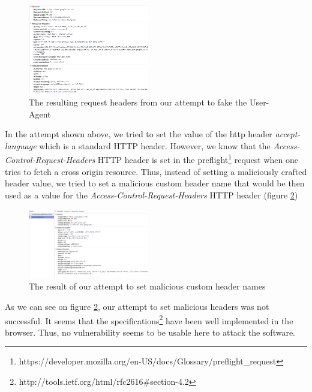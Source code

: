 \documentclass[journal]{IEEEtran}
\begin{document}
\begin{figure}[h]
\centering
\includegraphics[width=0.47\textwidth]{images/maliciousHeadersValues.png}
\caption{The resulting request headers from our attempt to fake the User-Agent}
\label{fig:maliciousHeadersValues}
\end{figure}

\medskip

In the attempt shown above, we tried to set the value of the http header \emph{accept-language} which is a standard HTTP header. However, we know that the \emph{Access-Control-Request-Headers} HTTP header is set in the preflight\footnote{https://developer.mozilla.org/en-US/docs/Glossary/preflight\_request} request when one tries to fetch a cross origin resource. Thus, instead of setting a maliciously crafted header value, we tried to set a malicious custom header name that would be then used as a value for the \emph{Access-Control-Request-Headers} HTTP header (figure \ref{fig:maliciousHeadersNames})

\begin{figure}[h]
\centering
\includegraphics[width=0.47\textwidth]{images/maliciousHeadersNames.png}
\caption{The result of our attempt to set malicious custom header names}
\label{fig:maliciousHeadersNames}
\end{figure}


As we can see on figure \ref{fig:maliciousHeadersNames}, our attempt to set malicious headers was not successful. It seems that the specifications\footnote{http://tools.ietf.org/html/rfc2616\#section-4.2} have been well implemented in the browser. Thus, no vulnerability seems to be usable here to attack the software. \\
\end{document}
